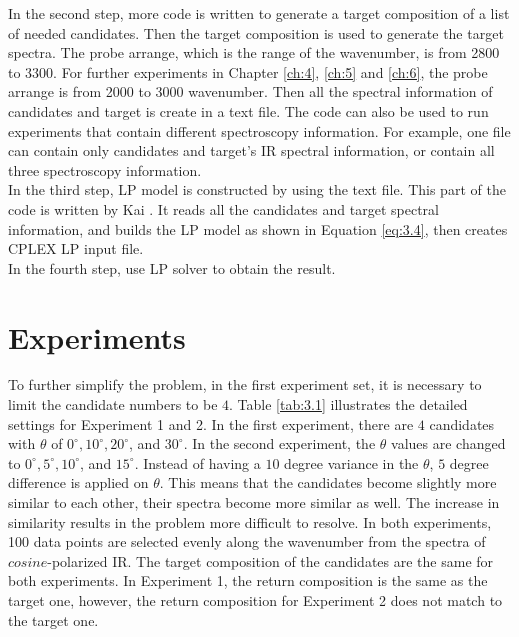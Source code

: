 In the second step, more code is written to generate a target composition of a list of needed candidates. Then the target composition is used to generate the target spectra. The probe arrange, which is the range of the wavenumber, is from 2800 to 3300. For further experiments in Chapter \ref{ch:4}, \ref{ch:5} and \ref{ch:6}, the probe arrange is from 2000 to 3000 wavenumber. Then all the spectral information of candidates and target is create in a text file. The code can also be used to run experiments that contain different spectroscopy information. For example, one file can contain only candidates and target's IR spectral information, or contain all three spectroscopy information. \\

In the third step, LP model is constructed by using the text file. This part of the code is written by Kai \cite{KuoKaiHung:Thesis:2015}. It reads all the candidates and target spectral information, and builds the LP model as shown in Equation \ref{eq:3.4}, then creates CPLEX LP input file. \\

In the fourth step, use LP solver to obtain the result. \\

\section{Experiments}
To further simplify the problem, in the first experiment set, it is necessary to limit the candidate numbers to be $4$. Table \ref{tab:3.1} illustrates the detailed settings for Experiment 1 and 2. In the first experiment, there are $4$ candidates with $\theta$ of $0^{\circ}, 10^{\circ}, 20^{\circ}$, and $30^{\circ}$. In the second experiment, the $\theta$ values are changed to $0^{\circ}, 5^{\circ}, 10^{\circ}$, and $15^{\circ}$. Instead of having a $10$ degree variance in the $\theta$, $5$ degree difference is applied on $\theta$. This means that the candidates become slightly more similar to each other, their spectra become more similar as well. The increase in similarity results in the problem more difficult to resolve. In both experiments, 100 data points are selected evenly along the wavenumber from the spectra of $cosine$-polarized IR. The target composition of the candidates are the same for both experiments. In Experiment 1, the return composition is the same as the target one, however, the return composition for Experiment 2 does not match to the target one. 

